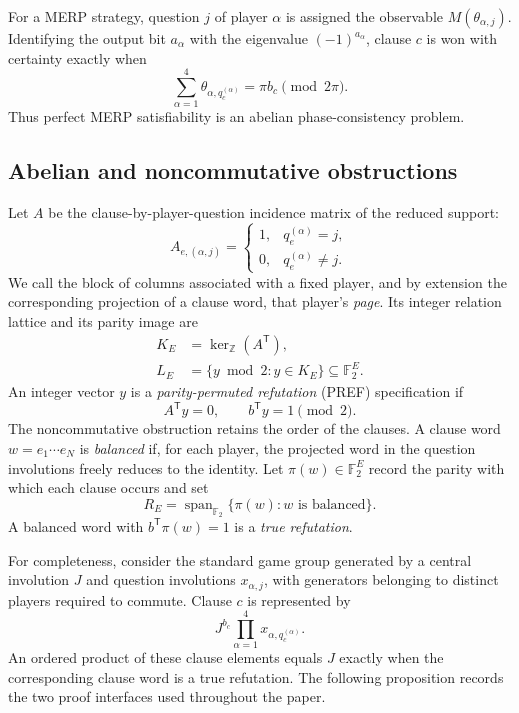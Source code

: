 \documentclass[11pt]{article}
\theoremstyle{definition}
\theoremstyle{remark}
\numberwithin{equation}{section}
\begin{document}
For a MERP strategy, question \(j\) of player \(\alpha\) is assigned the
observable \(M(\theta_{\alpha,j})\).  Identifying the output bit
\(a_\alpha\) with the eigenvalue \((-1)^{a_\alpha}\), clause \(c\) is won
with certainty exactly when
\begin{equation}\label{eq:merp-phase}
  \sum_{\alpha=1}^{4}
  \theta_{\alpha,q_c^{(\alpha)}}
  =\pi b_c\pmod{2\pi}.
\end{equation}
Thus perfect MERP satisfiability is an abelian phase-consistency problem.

\subsection{Abelian and noncommutative obstructions}
\label{sec:obstructions}

Let \(A\) be the clause-by-player-question incidence matrix of the reduced
support:
\[
  A_{e,(\alpha,j)}
  =
  \begin{cases}
    1,&q_e^{(\alpha)}=j,\\
    0,&q_e^{(\alpha)}\neq j.
  \end{cases}
\]
We call the block of columns associated with a fixed player, and by extension
the corresponding projection of a clause word, that player's \emph{page}.
Its integer relation lattice and its parity image are
\begin{align}
  K_E&=\ker_{\mathbb Z}(A^{\mathsf T}),\\
  L_E&=\{y\bmod2:y\in K_E\}\subseteq\mathbb F_2^E.
  \label{eq:LE-main}
\end{align}
An integer vector \(y\) is a \emph{parity-permuted refutation} (PREF) specification if
\begin{equation}\label{eq:pref-definition}
  A^{\mathsf T}y=0,
  \qquad
  b^{\mathsf T}y=1\pmod2.
\end{equation}
The noncommutative obstruction retains the order of the clauses.  A clause
word \(w=e_1\cdots e_N\) is \emph{balanced} if, for each player, the projected
word in the question involutions freely reduces to the identity.  Let
\(\pi(w)\in\mathbb F_2^E\) record the parity with which each clause occurs and
set
\begin{equation}\label{eq:RE-main}
  R_E=\operatorname{span}_{\mathbb F_2}
  \{\pi(w):w\text{ is balanced}\}.
\end{equation}
A balanced word with \(b^{\mathsf T}\pi(w)=1\) is a \emph{true refutation}.

For completeness, consider the standard game group generated by a central
involution \(J\) and question involutions \(x_{\alpha,j}\), with generators
belonging to distinct players required to commute.  Clause \(c\) is represented by
\[
  J^{b_c}\prod_{\alpha=1}^{4}x_{\alpha,q_c^{(\alpha)}}.
\]
An ordered product of these clause elements equals \(J\) exactly when the
corresponding clause word is a true refutation.  The following proposition
records the two proof interfaces used throughout the paper.
\end{document}
